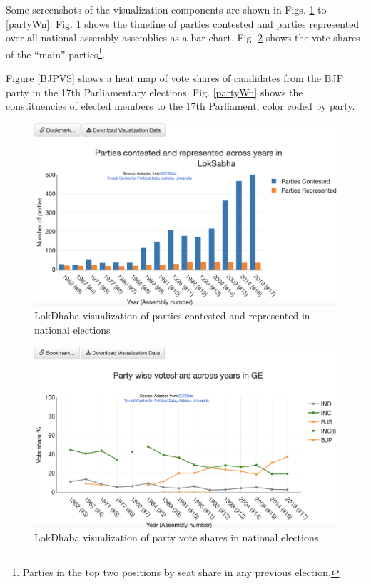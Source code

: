  Some screenshots of the visualization components are shown in Figs. \ref{partyCR} to \ref{partyWn}. Fig. \ref{partyCR} shows the timeline of parties contested and parties represented over all national assembly assemblies as a bar chart. Fig. \ref{partyVS} shows the vote shares of the ``main'' parties\footnote{Parties in the top two positions by seat share in any previous election.}.

  Figure \ref{BJPVS} shows a heat map of vote shares of candidates from the BJP party in the 17th Parliamentary elections. Fig. \ref{partyWn} shows the constituencies of elected members to the 17th Parliament, color coded by party.
 \begin{figure}
  \centering
  \includegraphics[width=\linewidth]{partiesContestedRepresented}
  \caption{LokDhaba visualization of parties contested and represented in national elections}
  \label{partyCR}
  \end{figure}
  
  \begin{figure}
  \centering
  \includegraphics[width=\linewidth]{partyVoteShareTimeline}
  \caption{LokDhaba visualization of party vote shares in national elections}
  \label{partyVS}
  \end{figure}

